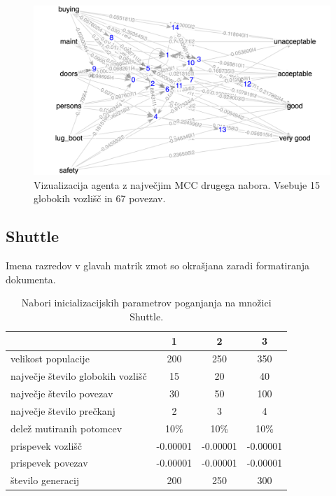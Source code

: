 \begin{figure}[H]
    \begin{center}
        \includegraphics[width=13cm]{car/3/mcc_g}
    \end{center}
    \caption{Vizualizacija agenta z največjim MCC drugega nabora. Vsebuje 15 globokih vozlišč in 67 povezav.}
    \label{fig:car_mcc_3_g}
\end{figure}


\subsection{Shuttle}\label{subsec:statlog_test}
Imena razredov v glavah matrik zmot so okrašjana zaradi formatiranja dokumenta.
\begin{table}[H]
    \caption{Nabori inicializacijskih parametrov poganjanja na množici Shuttle.}
    \begin{center}
        \begin{tabular}{||l c c c||}
            \hline
            & 1        & 2        & 3 \\ [0.5ex]
            \hline
            velikost populacije               & 200      & 250      & 350      \\
            \hline
            največje število globokih vozlišč & 15       & 20       & 40       \\
            \hline
            največje število povezav          & 30       & 50       & 100      \\
            \hline
            največje število prečkanj         & 2        & 3        & 4        \\
            \hline
            delež mutiranih potomcev          & 10\%     & 10\%     & 10\%     \\
            \hline
            prispevek vozlišč                 & -0.00001 & -0.00001 & -0.00001 \\
            \hline
            prispevek povezav                 & -0.00001 & -0.00001 & -0.00001 \\
            \hline
            število generacij                 & 200      & 250      & 300      \\
            \hline
        \end{tabular}
    \end{center}
    \label{tab:param_statlog}
\end{table}

